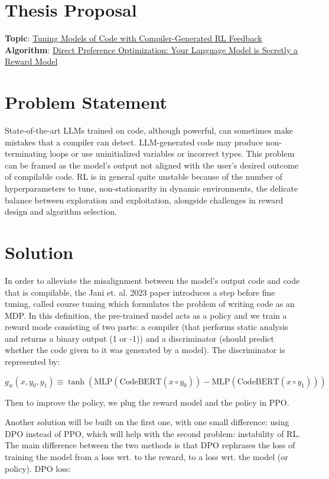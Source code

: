 \documentclass{article}
\begin{document}
\section*{Thesis Proposal}
\textbf{Topic}: \href{https://arxiv.org/abs/2305.18341}{Tuning Models of Code with Compiler-Generated RL Feedback}
\textbf{Algorithm}: \href{https://arxiv.org/abs/2305.18290}{Direct Preference Optimization: Your Language Model is Secretly a Reward Model}

\section*{Problem Statement}
State-of-the-art LLMs trained on code, although powerful, can sometimes make mistakes that a compiler can detect. LLM-generated code may produce non-terminating loops or use uninitialized variables or incorrect types. This problem can be framed as the model's output not aligned with the user’s desired outcome of compilable code. RL is in general quite unstable because of the number of hyperparameters to tune, non-stationarity in dynamic environments, the delicate balance between exploration and exploitation, alongside challenges in reward design and algorithm selection.

\section*{Solution}
In order to alleviate the misalignment between the model’s output code and code that is compilable, the Jani et. al. 2023 paper introduces a step before fine tuning, called course tuning which formulates the problem of writing code as an MDP. In this definition, the pre-trained model acts as a policy and we train a reward mode consisting of two parts: a compiler (that performs static analysis and returns a binary output (1 or -1)) and a discriminator (should predict whether the code given to it was generated by a model). The discriminator is represented by:

\[
g_w(x, y_0, y_1) \equiv \tanh(\text{MLP}(\text{CodeBERT}(x \circ y_0)) - \text{MLP}(\text{CodeBERT}(x \circ y_1)))
\]

Then to improve the policy, we plug the reward model and the policy in PPO. 

Another solution will be built on the first one, with one small difference: using DPO instead of PPO, which will help with the second problem: instability of RL. The main difference between the two methods is that DPO rephrases the loss of training the model from a loss wrt. to the reward, to a loss wrt. the model (or policy). DPO loss:
\end{document}
